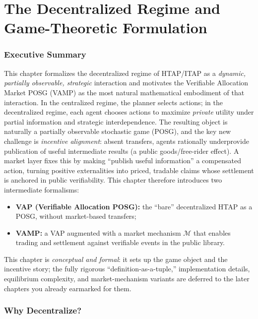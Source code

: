 \chapter{The Decentralized Regime and Game-Theoretic Formulation}\label{chap:decentralized}

\subsection{Executive Summary}

This chapter formalizes the decentralized regime of HTAP/ITAP as a \emph{dynamic, partially observable, strategic} interaction and motivates the Verifiable Allocation Market POSG (VAMP) as the most natural mathematical embodiment of that interaction. In the centralized regime, the planner selects actions; in the decentralized regime, each agent chooses actions to maximize \emph{private} utility under partial information and strategic interdependence. The resulting object is naturally a partially observable stochastic game (POSG), and the key new challenge is \emph{incentive alignment}: absent transfers, agents rationally underprovide publication of useful intermediate results (a public goods/free-rider effect). A market layer fixes this by making ``publish useful information'' a compensated action, turning positive externalities into priced, tradable claims whose settlement is anchored in public verifiability. This chapter therefore introduces two intermediate formalisms:

\begin{itemize}
\item \textbf{VAP (Verifiable Allocation POSG):} the ``bare'' decentralized HTAP as a POSG, without market-based transfers;
\item \textbf{VAMP:} a VAP augmented with a market mechanism \(\mathcal{M}\) that enables trading and settlement against verifiable events in the public library.
\end{itemize}

This chapter is \emph{conceptual and formal}: it sets up the game object and the incentive story; the fully rigorous ``definition-as-a-tuple,'' implementation details, equilibrium complexity, and market-mechanism variants are deferred to the later chapters you already earmarked for them.

\subsection{Why Decentralize?}

